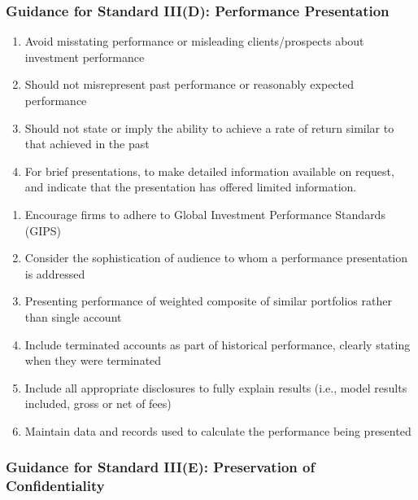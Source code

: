 \subsubsection{Guidance for Standard III(D): Performance Presentation}

\begin{remark} 
\begin{enumerate}[label=\roman*.]
\setlength{\itemsep}{0pt}
\item Avoid misstating performance or misleading clients/prospects about investment performance
\item Should not misrepresent past performance or reasonably expected performance
\item Should not state or imply the ability to achieve a rate of return similar to that achieved in the past
\item For brief presentations, to make detailed information available on request, and indicate that the presentation has offered limited information.
\end{enumerate}
\end{remark}

\begin{remark} 
\begin{enumerate}[label=\roman*.]
\setlength{\itemsep}{0pt}
\item Encourage firms to adhere to Global Investment Performance Standards (GIPS)
\item Consider the sophistication of audience to whom a performance presentation is addressed
\item Presenting performance of weighted composite of similar portfolios rather than single account
\item Include terminated accounts as part of historical performance, clearly stating when they were terminated
\item Include all appropriate disclosures to fully explain results (i.e., model results included, gross or net of fees)
\item Maintain data and records used to calculate the performance being presented
\end{enumerate}
\end{remark}

\subsubsection{Guidance for Standard III(E): Preservation of Confidentiality}


